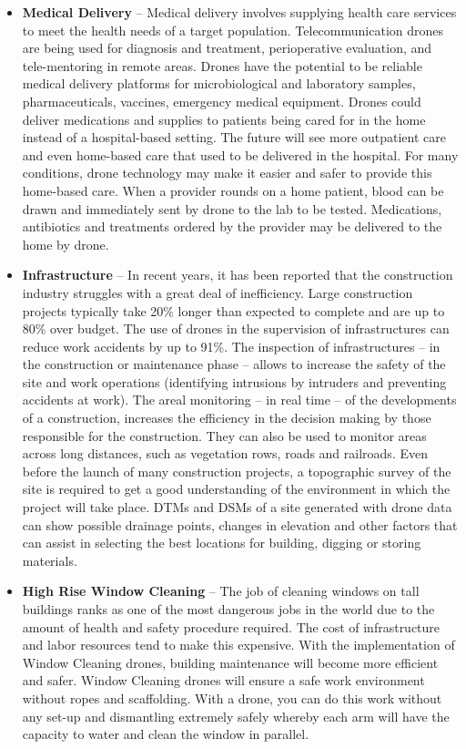 \begin{itemize}
    \item \textbf{Medical Delivery} -- Medical delivery involves supplying health care services to meet the health needs of a target population. Telecommunication drones are being used for diagnosis and treatment, perioperative evaluation, and tele-mentoring in remote areas.
    Drones have the potential to be reliable medical delivery platforms for microbiological and laboratory samples, pharmaceuticals, vaccines, emergency medical equipment. Drones could deliver medications and supplies to patients being cared for in the home instead of a hospital-based setting.
    The future will see more outpatient care and even home-based care that used to be delivered in the hospital. For many conditions, drone technology may make it easier and safer to provide this home-based care. When a provider rounds on a home patient, blood can be drawn and immediately sent by drone to the lab to be tested. Medications, antibiotics and treatments ordered by the provider may be delivered to the home by drone.

    \item \textbf{Infrastructure} -- In recent years, it has been reported that the construction industry struggles with a great deal of inefficiency. Large construction projects typically take 20\% longer than expected to complete and are up to 80\% over budget.
    The use of drones in the supervision of infrastructures can reduce work accidents by up to 91\%. The inspection of infrastructures -- in the construction or maintenance phase -- allows to increase the safety of the site and work operations (identifying intrusions by intruders and preventing accidents at work).
    The areal monitoring -- in real time -- of the developments of a construction, increases the efficiency in the decision making by those responsible for the construction. They can also be used to monitor areas across long distances, such as vegetation rows, roads and railroads. Even before the launch of many construction projects, a topographic survey of the site is required to get a good understanding of the environment in which the project will take place. DTMs and DSMs of a site generated with drone data can show possible drainage points, changes in elevation and other factors that can assist in selecting the best locations for building, digging or storing materials. 

    \item \textbf{High Rise Window Cleaning} -- The job of cleaning windows on tall buildings ranks as one of the most dangerous jobs in the world due to the amount of health and safety procedure required. The cost of infrastructure and labor resources tend to make this expensive.
    With the implementation of Window Cleaning drones, building maintenance will become more efficient and safer. Window Cleaning drones will ensure a safe work environment without ropes and scaffolding.
    With a drone, you can do this work without any set-up and dismantling extremely safely whereby each arm will have the capacity to water and clean the window in parallel. 
    

\end{itemize}
